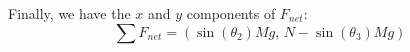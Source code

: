 \documentclass{article}
\begin{document}
Finally, we have the $x$ and $y$ components of $F_{net}$:
\[ \boxed{\sum F_{net} = (\sin(\theta_2)Mg, \, N-\sin(\theta_3)Mg)} \]


\end{document}
